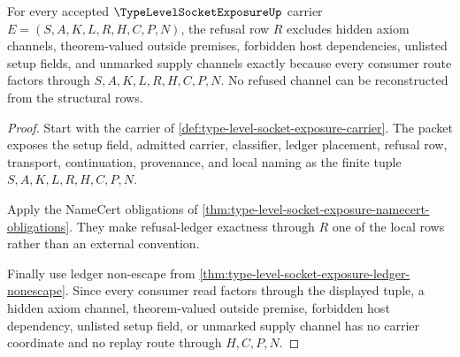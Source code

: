 \begin{theorem}
\label{thm:type-level-socket-exposure-refusal-exactness}
For every accepted $\TypeLevelSocketExposureUp$ carrier $E=(S,A,K,L,R,H,C,P,N)$, the refusal row $R$ excludes hidden axiom channels, theorem-valued outside premises, forbidden host dependencies, unlisted setup fields, and unmarked supply channels exactly because every consumer route factors through $S,A,K,L,R,H,C,P,N$. No refused channel can be reconstructed from the structural rows.
\end{theorem}
\begin{proof}
Start with the carrier of \autoref{def:type-level-socket-exposure-carrier}. The packet exposes the setup field, admitted carrier, classifier, ledger placement, refusal row, transport, continuation, provenance, and local naming as the finite tuple $S,A,K,L,R,H,C,P,N$.

Apply the NameCert obligations of \autoref{thm:type-level-socket-exposure-namecert-obligations}. They make refusal-ledger exactness through $R$ one of the local rows rather than an external convention.

Finally use ledger non-escape from \autoref{thm:type-level-socket-exposure-ledger-nonescape}. Since every consumer read factors through the displayed tuple, a hidden axiom channel, theorem-valued outside premise, forbidden host dependency, unlisted setup field, or unmarked supply channel has no carrier coordinate and no replay route through $H,C,P,N$.
\end{proof}

